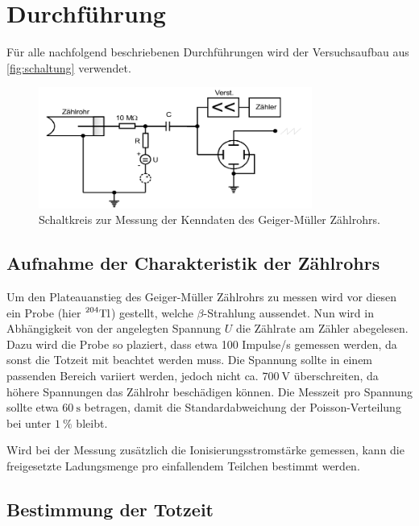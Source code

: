 \section{Durchführung}
\label{sec:Durchführung}

Für alle nachfolgend beschriebenen Durchführungen wird der Versuchsaufbau aus \autoref{fig:schaltung} verwendet.

\begin{figure}
    \centering
    \includegraphics[width=0.8\textwidth]{images/skizze_4.png}
    \caption{Schaltkreis zur Messung der Kenndaten des Geiger-Müller Zählrohrs.\cite{V703}}
    \label{fig:schaltung}
\end{figure}

\subsection{Aufnahme der Charakteristik der Zählrohrs}
\label{ssec:charakteristik_durchführung}

Um den Plateauanstieg des Geiger-Müller Zählrohrs zu messen wird vor diesen ein Probe (hier $\prescript{204}{}{\text{Tl}}$) gestellt, welche $\beta$-Strahlung aussendet.
Nun wird in Abhängigkeit von der angelegten Spannung $U$ die Zählrate am Zähler abegelesen.
Dazu wird die Probe so plaziert, dass etwa 100 Impulse/s gemessen werden, da sonst die Totzeit mit beachtet werden muss.
Die Spannung sollte in einem passenden Bereich variiert werden, jedoch nicht ca. $\SI{700}{\volt}$ überschreiten, da höhere Spannungen das Zählrohr beschädigen können.
Die Messzeit pro Spannung sollte etwa $\SI{60}{\second}$ betragen, damit die Standardabweichung der Poisson-Verteilung bei unter $\SI{1}{\percent}$ bleibt.

Wird bei der Messung zusätzlich die Ionisierungsstromstärke gemessen, kann die freigesetzte Ladungsmenge pro einfallendem Teilchen bestimmt werden.

\subsection{Bestimmung der Totzeit}
\label{ssec:totzeit_durchführung}

